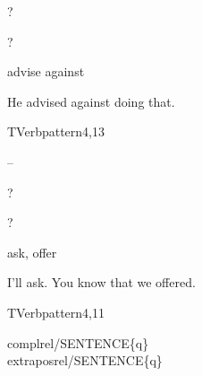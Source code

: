 
\begin{thetadescr}
\evitem ?
\esitem
     \begin{examples}
        \example ?
     \end{examples}
\end{thetadescr}



\begin{thetadescr}
\evitem advise against
\esitem
     \begin{examples}
        \example  He advised against doing that.
     \end{examples}
\end{thetadescr}


\newpage
{}
\begin{vpattern}
 TVerbpattern4,13
\csritem \mbox{}\\
     \begin{csr}
       --
     \end{csr}
\remarksitem
\end{vpattern}


\begin{thetadescr}
\evitem ?
\esitem
     \begin{examples}
        \example ?
     \end{examples}
\end{thetadescr}



\begin{thetadescr}
\evitem ask, offer
\esitem
     \begin{examples}
        \example  I'll ask.
        \example You know that we offered.
     \end{examples}
\end{thetadescr}


\newpage
{}
\begin{vpattern}
 TVerbpattern4,11
\csritem \mbox{}\\
     \begin{csr}
     complrel/SENTENCE\{q\}\\
     extraposrel/SENTENCE\{q\}
     \end{csr}
\remarksitem
\end{vpattern}



